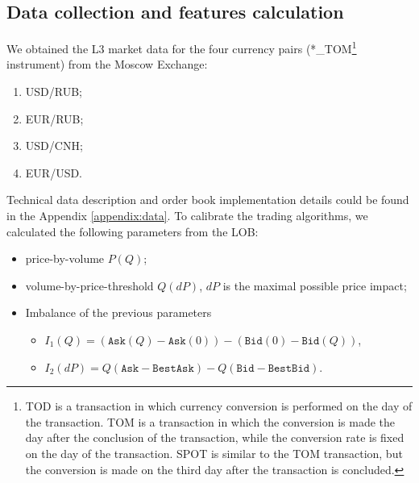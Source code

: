     \subsection{Data collection and features calculation}
        We obtained the L3 market data for the four currency pairs (*\_TOM\footnote{TOD is a transaction in which currency conversion is performed on the day of the transaction.
        TOM is a transaction in which the conversion is made the day after the conclusion of the transaction, while the conversion rate is fixed on the day of the transaction.
        SPOT is similar to the TOM transaction, but the conversion is made on the third day after the transaction is concluded.} instrument) from the Moscow Exchange:
        \begin{enumerate}
            \item USD/RUB; 
            \item EUR/RUB; 
            \item USD/CNH;
            \item EUR/USD.
        \end{enumerate} 
        Technical data description and order book implementation details could be found in the Appendix \ref{appendix:data}.
        To calibrate the trading algorithms, we calculated the following parameters from the LOB:
        \begin{itemize}
            \item price-by-volume $P(Q)$;
            \item volume-by-price-threshold $Q(dP)$, $dP$ is the maximal possible price impact;
            \item Imbalance of the previous parameters\begin{itemize}
                \item $I_1(Q) = (\texttt{Ask}(Q) - \texttt{Ask}(0)) - (\texttt{Bid}(0) - \texttt{Bid}(Q))$,
                \item $I_2(dP) = Q(\texttt{Ask} - \texttt{BestAsk}) - Q(\texttt{Bid} - \texttt{BestBid})$.
            \end{itemize}
        \end{itemize}


